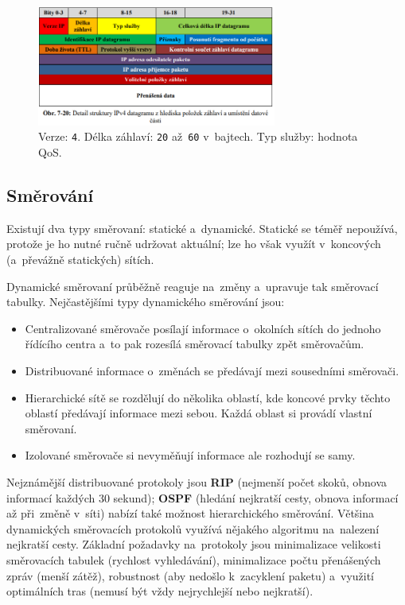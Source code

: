 \begin{figure}
	\centering
	\includegraphics[width=0.7\textwidth]{images/q07_ip_packet}
	\caption*{Verze: \texttt{4}. Délka záhlaví: \texttt{20} až~\texttt{60} v~bajtech. Typ služby: hodnota QoS. }
\end{figure}

\subsection{Směrování}

Existují dva typy směrovaní: statické a~dynamické. Statické se téměř nepoužívá, protože je ho nutné ručně udržovat aktuální; lze ho však využít v~koncových (a~převážně statických) sítích.

Dynamické směrovaní průběžně reaguje na~změny a~upravuje tak směrovací tabulky. Nejčastějšími typy dynamického směrování jsou:

\begin{itemize}[noitemsep]
    \item Centralizované směrovače posílají informace o~okolních sítích do jednoho řídícího centra a~to pak rozesílá směrovací tabulky zpět směrovačům.
    \item Distribuované informace o~změnách se předávají mezi sousedními směrovači.
    \item Hierarchické sítě se rozdělují do několika oblastí, kde koncové prvky těchto oblastí předávají informace mezi sebou. Každá oblast si provádí vlastní směrovaní.
    \item Izolované směrovače si nevyměňují informace ale rozhodují se samy.
\end{itemize}

Nejznámější distribuované protokoly jsou \textbf{RIP} (nejmenší počet skoků, obnova informací každých 30 sekund); \textbf{OSPF} (hledání nejkratší cesty, obnova informací až při~změně v~síti) nabízí také možnost hierarchického směrování. Většina dynamických směrovacích protokolů využívá nějakého algoritmu na~nalezení nejkratší cesty. Základní požadavky na~protokoly jsou minimalizace velikosti směrovacích tabulek (rychlost vyhledávání), minimalizace počtu přenášených zpráv (menší zátěž), robustnost (aby nedošlo k~zacyklení paketu) a~využití optimálních tras (nemusí být vždy nejrychlejší nebo nejkratší).

